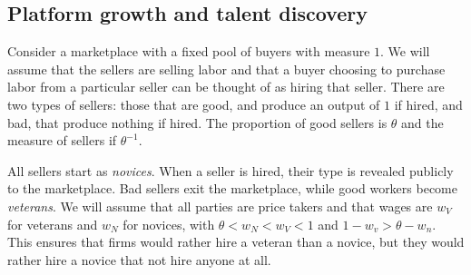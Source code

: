  




\subsection{Platform growth and talent discovery} 
Consider a marketplace with a fixed pool of buyers with measure
$1$. We will assume that the sellers are selling labor and that a
buyer choosing to purchase labor from a particular seller can be
thought of as hiring that seller. There are two types of sellers:
those that are good, and produce an output of $1$ if hired, and bad,
that produce nothing if hired. The proportion of good sellers is
$\theta$ and the measure of sellers if $\theta^{-1}$.

All sellers start as \emph{novices}. When a seller is hired, their
type is revealed publicly to the marketplace. Bad sellers exit the
marketplace, while good workers become \emph{veterans}. We will assume
that all parties are price takers and that wages are $w_V$ for
veterans and $w_N$ for novices, with $\theta < w_N < w_V < 1$ and $1-
w_v > \theta - w_n$. This ensures that firms would rather hire a
veteran than a novice, but they would rather hire a novice that not
hire anyone at all.

